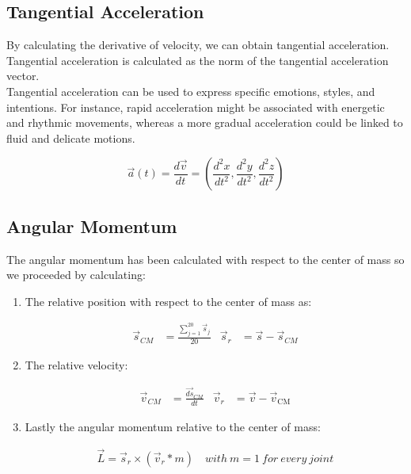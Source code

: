 \subsection{Tangential Acceleration}
By calculating the derivative of velocity, we can obtain tangential acceleration.
Tangential acceleration is calculated as the norm of the tangential acceleration vector. \\
Tangential acceleration can be used to express specific emotions, styles, and intentions.
For instance, rapid acceleration might be associated with energetic and rhythmic movements, whereas a more gradual acceleration could be linked to fluid and delicate motions.

\begin{equation}
  \vec{a}(t) = \frac{d\vec{v}}{dt} = \left(\frac{d^2x}{dt^2}, \frac{d^2y}{dt^2}, \frac{d^2z}{dt^2}\right)
\end{equation}

\subsection{Angular Momentum}
The angular momentum has been calculated with respect to the center of mass so we proceeded by calculating:
\begin{enumerate}
  \item The relative position with respect to the center of mass as: 
  \begin{table}[h]
    \begin{align}
        \vec{s}_{CM} &= \frac{{\sum_{j=1}^{20} \vec{s}_{j}}}{{20}} &
        \vec{s}_{r} &= \vec{s} - \vec{s}_{CM} \label{eq:rel_pos}
    \end{align}
  \end{table}
  \item The relative velocity:
  \begin{table}[H]
    \begin{align}
        \vec{v}_{CM} &= \frac{\vec{ds}_{CM}}{dt} &
        \vec{v}_{r} &= \vec{v} - \vec{v}_{\text{CM}} \label{eq:rel_vel}
    \end{align}
  \end{table}
  \item Lastly the angular momentum relative to the center of mass:
  \begin{table}[H]
    \begin{align}
      \vec{L} = \vec{s}_{r} \times (\vec{v}_{r} * m) \quad with \ m = 1 \ for \ every \ joint \label{eq:ang_mom}
    \end{align}
  \end{table}
\end{enumerate}

